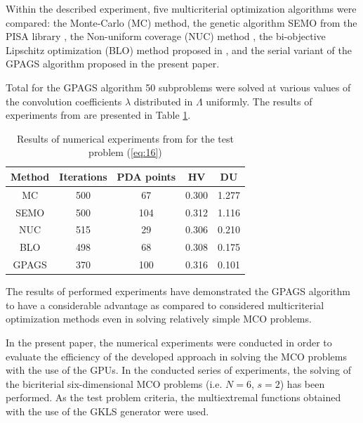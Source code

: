 \documentclass[runningheads]{llncs}
\begin{document}
Within the described experiment, five multicriterial optimization algorithms were compared: the Monte-Carlo (MC) method, the genetic algorithm SEMO from the PISA library \cite{c7,c42}, the Non-uniform coverage (NUC) method \cite{c7}, the bi-objective Lipschitz optimization (BLO) method proposed in \cite{c42}, and the serial variant of the GPAGS algorithm proposed in the present paper.

Total for the GPAGS algorithm 50 subproblems were solved at various values of the convolution coefficients $\lambda$ distributed in $\Lambda$  uniformly. The results of experiments from \cite{c16} are presented in Table \ref{tab:01}.

\begin{table}[htbp]
\centering
\caption{Results of numerical experiments from \cite{c16} for the test problem (\ref{eq:16})}
\label{tab:01}
\begin{tabular}{ccccc}
\hline
\textbf{Method} & \textbf{Iterations} & \textbf{PDA points} & \textbf{HV} & \textbf{DU} \\ \hline
MC              & 500                 & 67                  & 0.300       & 1.277       \\
SEMO            & 500                 & 104                 & 0.312       & 1.116       \\
NUC             & 515                 & 29                  & 0.306       & 0.210       \\
BLO             & 498                 & 68                  & 0.308       & 0.175       \\
GPAGS           & 370                 & 100                 & 0.316       & 0.101       \\ \hline
\end{tabular}
\end{table}

The results of performed experiments have demonstrated the GPAGS algorithm to have a considerable advantage as compared to considered multicriterial optimization methods even in solving relatively simple MCO problems.

In the present paper, the numerical experiments were conducted in order to evaluate the efficiency of the developed approach in solving the MCO problems with the use of the GPUs. In the conducted series of experiments, the solving of the bicriterial six-dimensional MCO problems (i.e. $N = 6$, $s = 2$) has been performed. As the test problem criteria, the multiextremal functions obtained with the use of the GKLS generator \cite{c43} were used. 
\end{document}
